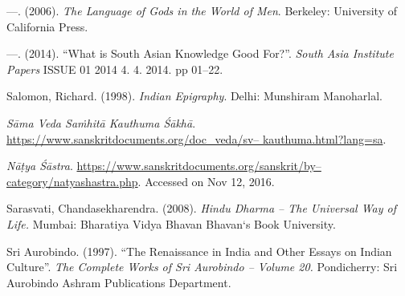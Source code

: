 \begin{thebibliography}{99}
  —. (2006). \textit{The Language of Gods in the World of Men}. Berkeley: University of California Press.

  —. (2014). “What is South Asian Knowledge Good For?”. \textit{South Asia Institute Papers} ISSUE 01 2014 4. 4. 2014. pp 01–22.

  Salomon, Richard. (1998). \textit{Indian Epigraphy}. Delhi: Munshiram Manoharlal.

  \textit{Sāma Veda Saṁhitā Kauthuma Śākhā}. \url{https://www.sanskritdocuments.org/doc_veda/sv– kauthuma.html?lang=sa}.

  \textit{Nāṭya Śāstra}. \url{https://www.sanskritdocuments.org/sanskrit/by–category/natyashastra.php}. Accessed on Nov 12, 2016.

  Sarasvati, Chandasekharendra. (2008). \textit{Hindu Dharma – The Universal Way of Life.} Mumbai: Bharatiya Vidya Bhavan Bhavan‘s Book University.

  Sri Aurobindo. (1997). “The Renaissance in India and Other Essays on Indian Culture”. \textit{The Complete Works of Sri Aurobindo – Volume 20.} Pondicherry: Sri Aurobindo Ashram Publications Department.

 \end{thebibliography}

